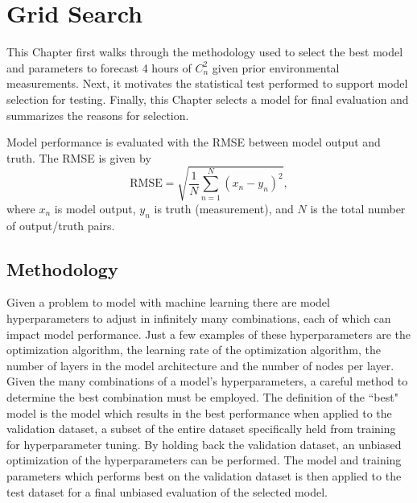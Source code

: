 \chapter{Grid Search}
\label{ch4}
This Chapter first walks through the methodology used to select the best model and parameters to forecast 4 hours of $C_{n}^{2}$ given prior environmental measurements. Next, it motivates the statistical test performed to support model selection for testing. Finally, this Chapter selects a model for final evaluation and summarizes the reasons for selection.

Model performance is evaluated with the \ac{RMSE} between model output and truth. The \ac{RMSE} is given by
\begin{equation} \label{eq:RMSE}
	\text{RMSE} = \sqrt{\frac{1}{N} \sum_{n=1}^{N} \left(x_{n} - y_{n}\right)^{2}},
\end{equation}
where $x_{n}$ is model output, $y_{n}$ is truth (measurement), and $N$ is the total number of output/truth pairs.

\section{Methodology}
\label{sec:grid_search_methodology}
Given a problem to model with machine learning there are model hyperparameters to adjust in infinitely many combinations, each of which can impact model performance. Just a few examples of these hyperparameters are the optimization algorithm, the learning rate of the optimization algorithm, the number of layers in the model architecture and the number of nodes per layer. Given the many combinations of a model's hyperparameters, a careful method to determine the best combination must be employed. The definition of the ``best" model is the model which results in the best performance when applied to the validation dataset, a subset of the entire dataset specifically held from training for hyperparameter tuning. By holding back the validation dataset, an unbiased optimization of the hyperparameters can be performed. The model and training parameters which performs best on the validation dataset is then applied to the test dataset for a final unbiased evaluation of the selected model.

